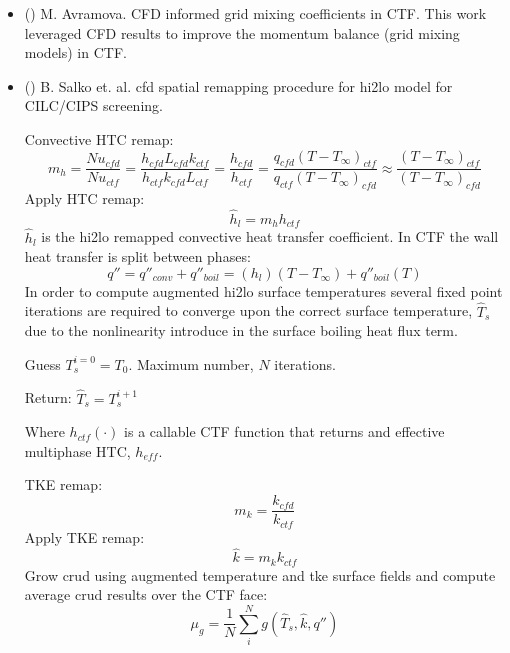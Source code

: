 \begin{itemize}
    \item (\checkmark) M. Avramova.  CFD informed grid mixing coefficients in CTF.  This work leveraged CFD results to improve the momentum balance (grid mixing models) in CTF. \cite{avramova2007}
    \item (\checkmark) B. Salko et. al. cfd spatial remapping procedure for hi2lo model for CILC/CIPS screening. \cite{salko17}
    
    Convective HTC remap:
    \begin{equation}
    	m_h = \frac{Nu_{cfd}}{Nu_{ctf}} = \frac{h_{cfd} L_{cfd} k_{ctf} }{h_{ctf}k_{cfd} L_{ctf}} = \frac{h_{cfd}}{h_{ctf}} = \frac{q_{cfd}(T-T_\infty)_{ctf}}{q_{ctf}(T-T_\infty)_{cfd}} \approx \frac{(T-T_\infty)_{ctf}}{(T-T_\infty)_{cfd}}  
    \end{equation}
    Apply HTC remap:
    \begin{equation}
    	\hat h_{l} = m_h h_{ctf}
    \end{equation}
    $\hat h_l$ is the hi2lo remapped convective heat transfer coefficient.  In CTF the wall heat transfer is split between phases:
    \begin{equation}
    q'' = q''_{conv} + q''_{boil} = (h_l)(T-T_{\infty}) + q''_{boil}(T)
    \end{equation}
    In order to compute augmented hi2lo surface temperatures
    several fixed point iterations are required to converge upon the correct surface temperature, $\hat T_s$ due to the nonlinearity introduce in the surface boiling heat flux term.
    
    \begin{algorithm}[H]
    Guess $T^{i=0}_s=T_0$.  Maximum number, $N$ iterations.
    
Return: $\hat T_s = T^{i+1}_s$
\end{algorithm}
    Where $h_{ctf}(\cdot)$ is a callable CTF function that returns and effective multiphase HTC, $h_{eff}$.
    
    TKE remap:
    \begin{equation}
       m_{k} = \frac{k_{cfd}}{k_{ctf}}
    \end{equation}
    Apply TKE remap:
       \begin{equation}
       \hat k = m_k k_{ctf}
       \end{equation}
     Grow crud using augmented temperature and tke surface fields and compute average crud results over the CTF face:
     \begin{equation}
     \mu_g = \frac{1}{N} \sum_i^N g(\hat T_s, \hat k, q'')
     \end{equation}
    

\end{itemize}
